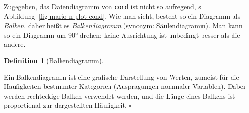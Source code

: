 \documentclass[
  letterpaper,
]{scrbook}
\theoremstyle{definition}
\theoremstyle{definition}
\newtheorem{definition}{Definition}[chapter]
\theoremstyle{definition}
\theoremstyle{remark}
\begin{document}
Zugegeben, das Datendiagramm von \texttt{cond} ist nicht so aufregend,
s. Abbildung~\ref{fig-mario-n-plot-cond}. Wie man sieht, besteht so ein
Diagramm als \emph{Balken}, daher heißt es \emph{Balkendiagramm}
(synonym: Säulendiagramm). Man kann so ein Diagramm um 90° drehen; keine
Ausrichtung ist unbedingt besser als die andere.

\begin{definition}[Balkendiagramm]\protect\hypertarget{def-balken}{}\label{def-balken}

Ein Balkendiagramm ist eine grafische Darstellung von Werten, zumeist
für die Häufigkeiten bestimmter Kategorien (Ausprägungen nominaler
Variablen). Dabei werden rechteckige Balken verwendet werden, und die
Länge eines Balkens ist proportional zur dargestellten Häufigkeit.
\(\square\)

\end{definition}
\end{document}
